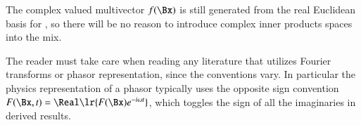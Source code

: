 The complex valued multivector \( f(\Bx) \) is still generated from the real Euclidean basis for , so
there will be
no reason to introduce complex inner products spaces into the mix.

The reader must take care when reading any literature that utilizes Fourier transforms or phasor representation, since the conventions vary.
In particular the physics representation of a phasor typically uses the opposite sign convention
\( F(\Bx, t) = \Real\lr{ F(\Bx) e^{-i \omega t }} \), which toggles the sign of all the imaginaries in derived results.
